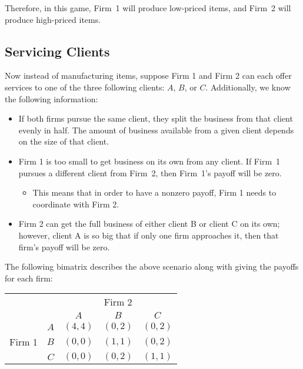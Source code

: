 \documentclass[twoside]{article}
\begin{document}
Therefore, in this game, Firm~1 will produce low-priced items, and Firm~2 will produce high-priced items.

\subsection{Servicing Clients}
Now instead of manufacturing items, suppose Firm 1 and Firm 2 can each offer services to one of the three following clients: $A$, $B$, or $C$. Additionally, we know the following information:

\begin{itemize}
    \item If both firms pursue the same client, they split the business from that client evenly in half. The amount of business available from a given client depends on the size of that client.
    \item Firm 1 is too small to get business on its own from any client. If Firm~1 pursues a different client from Firm~2, then Firm~1's payoff will be zero.
    \begin{itemize}
        \item This means that in order to have a nonzero payoff, Firm 1 needs to coordinate with Firm 2.
    \end{itemize}
    \item Firm 2 can get the full business of either client B or client C on its own; however, client A is so big that if only one firm approaches it, then that firm's payoff will be zero.
\end{itemize}

The following bimatrix describes the above scenario along with giving the payoffs for each firm:

\begin{table}[h]
\centering
\renewcommand{\arraystretch}{1.5}
\begin{tabular}{cr|r|r|r|}
& \multicolumn{1}{c}{} & \multicolumn{3}{c}{Firm 2} \\
& \multicolumn{1}{c}{} & \multicolumn{1}{c}{$A$} & \multicolumn{1}{c}{$B$} & \multicolumn{1}{c}{$C$} \\ \cline{3-5}
& $A$ & $(4, 4)$ & $(0, 2)$ & $(0, 2)$ \\ \cline{3-5}
\multicolumn{1}{c}{Firm 1} & $B$ & $(0, 0)$ & $(1, 1)$ & $(0, 2)$ \\ \cline{3-5}
& $C$ & $(0, 0)$ & $(0, 2)$ & $(1, 1)$ \\ \cline{3-5}
\end{tabular}
\end{table}
\end{document}
